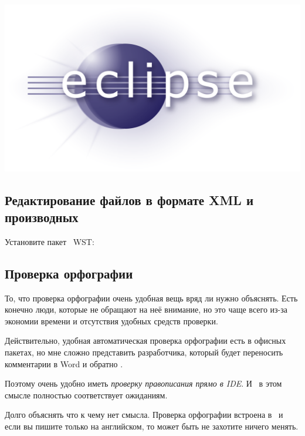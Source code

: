 \chapter{\eclipse}\label{eclipse}

\includegraphics[height=0.5\textheight]{logo/eclipse.png}

\section{Редактирование файлов в формате XML и производных}

Установите пакет \eclipse\ WST:


\section{Проверка орфографии}


То, что проверка орфографии очень удобная вещь вряд ли нужно объяснять. Есть
конечно люди, которые не обращают на неё внимание, но это чаще всего из-за
экономии времени и отсутствия удобных средств проверки.

Действительно, удобная автоматическая проверка орфографии есть в офисных
пакетах, но мне сложно представить разработчика, который будет переносить
комментарии в Word и обратно \smiley.

Поэтому очень удобно иметь \emph{проверку правописания прямо в IDE}. И \eclipse\
в этом смысле полностью соответствует ожиданиям.

Долго объяснять что к чему нет смысла. Проверка орфографии встроена в \eclipse\
и если вы пишите только на английском, то может быть не захотите ничего менять.

